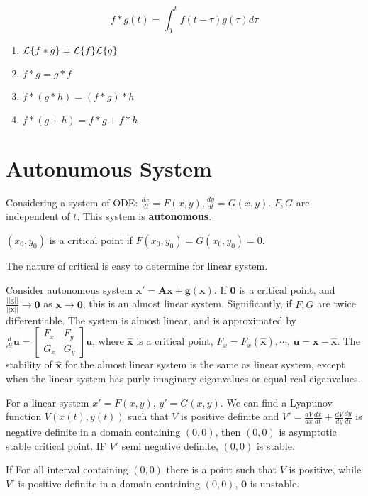 \documentclass[12pt]{article}
\begin{document}
\begin{theorem}
	$$ f*g(t) =  \int_{0}^{t} f(t-\tau)g(\tau) d\tau$$
	\begin{enumerate}
		\item $\mathcal{L}\{f*g\} = \mathcal{L}\{f\} \mathcal{L}\{g\}$
		\item $f*g = g*f$
		\item $f*(g*h) = (f*g)*h$
		\item $f*(g+h) = f*g + f*h$
	\end{enumerate}
\end{theorem}

\section{Autonumous System}
Considering a system of ODE: $\frac{dx}{dt} = F(x,y), \frac{dy}{dt} = G(x,y)$. $F, G$ are independent of $t$. This system is \textbf{autonomous}.

\begin{definition}
	$(x_0, y_0)$ is a critical point if $F(x_0, y_0) = G(x_0, y_0) = 0$.
\end{definition}

The nature of critical is easy to determine for linear system. 

\begin{definition}
	Consider autonomous system $\bm{x}' = \bm{A}\bm{x} + \bm{g}(\bm{x})$.  
	If $\bm{0}$ is a critical point, and $\frac{||\bm{g}||}{||\bm{x}||} \rightarrow \bm{0}$ as $\bm{x} \rightarrow \bm{0}$, this is an almost linear system.
	Significantly, if $F, G$ are twice differentiable. The system is almost linear, and is approximated by
	$\frac{d}{dt} \bm{u} = \begin{bmatrix} F_x & F_y \\ G_x & G_y \end{bmatrix} \bm{u} $, where $\hat{\bm{x}}$ is a critical point, $F_x = F_x(\hat{\bm{x}}), \cdots$, $\bm{u} = \bm{x} - \hat{\bm{x}}$.
	The stability of $\hat{\bm{x}}$ for the almost linear system is the same as linear system, except when the linear system has purly imaginary eiganvalues or equal real eiganvalues.
\end{definition}

\begin{theorem}[Lyapunov]
	For a linear system $x' = F(x,y)$, $y' = G(x,y)$. We can find a Lyapunov function $V(x(t), y(t))$ such that $V$ is positive definite and $V' = \frac{dV}{dx}\frac{dx}{dt} + \frac{dV}{dy} \frac{dy}{dt} $ is negative definite in a domain containing $(0,0)$, then $(0,0)$ is asymptotic stable critical point. IF $V'$ semi negative definite, $(0,0)$ is stable. 

	If For all interval containing $(0,0)$ there is a point such that $V$ is positive, while $V'$ is positive definite in a domain containing $(0,0)$, $\bm{0}$ is unstable.
\end{theorem}
\end{document}
